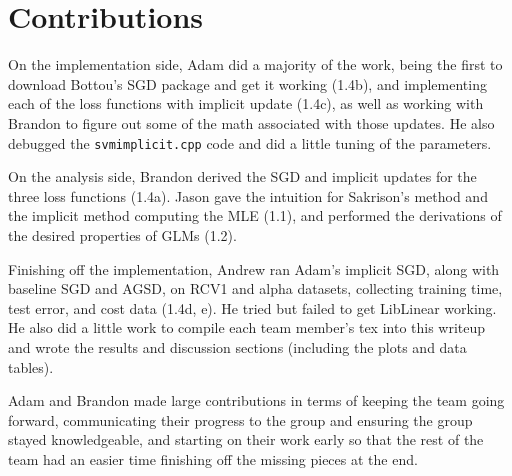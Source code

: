 \documentclass{article}
\begin{document}
\section{Contributions}
On the implementation side, Adam did a majority of the work, being the first to download Bottou's SGD package and get it working (1.4b), and implementing each of the loss functions with implicit update (1.4c), as well as working with Brandon to figure out some of the math associated with those updates. He also debugged the \texttt{svmimplicit.cpp} code and did a little tuning of the parameters.

On the analysis side, Brandon derived the SGD and implicit updates for the three loss functions (1.4a). Jason gave the intuition for Sakrison's method and the implicit method computing the MLE (1.1), and performed the derivations of the desired properties of GLMs (1.2).

Finishing off the implementation, Andrew ran Adam's implicit SGD, along with baseline SGD and AGSD, on RCV1 and alpha datasets, collecting training time, test error, and cost data (1.4d, e). He tried but failed to get LibLinear working. He also did a little work to compile each team member's tex into this writeup and wrote the results and discussion sections (including the plots and data tables).

Adam and Brandon made large contributions in terms of keeping the team going forward, communicating their progress to the group and ensuring the group stayed knowledgeable, and starting on their work early so that the rest of the team had an easier time finishing off the missing pieces at the end.
\end{document}
